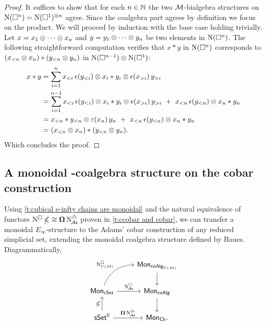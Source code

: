 \begin{proof}
	It suffices to show that for each $n \in \mathbb{N}$ the two $\mathcal{M}$-bialgebra structures on $\operatorname{N}(\square^n) = \operatorname{N}(\square^1)^{\otimes n}$ agree.
	Since the coalgebra part agrees by definition we focus on the product.
	We will proceed by induction with the base case holding trivially.
	Let $x = x_1 \otimes \dotsb \otimes x_n$ and $y = y_1 \otimes \dotsb \otimes y_n$ be two elements in $\operatorname{N}(\square^n)$.
	The following straightforward computation verifies that $x \ast y$ in $\operatorname{N}(\square^n)$ corresponds to $(x_{<n} \otimes x_n) \ast (y_{<n} \otimes y_n)$ in $\operatorname{N}(\square^{n-1}) \otimes \operatorname{N}(\square^1)$:
	\begin{align*}
		x \ast y &=
		\sum_{i=1}^n x_{<i}\, \epsilon(y_{<i}) \otimes x_i \ast y_i \otimes \epsilon(x_{>i}) \, y_{>i} \\ &=
		\sum_{i=1}^{n-1} x_{<i}\, \epsilon(y_{<i}) \otimes x_i \ast y_i \otimes \epsilon(x_{>i}) \, y_{>i} \ +\
		x_{<n}\, \epsilon(y_{<n}) \otimes x_n \ast y_n \\ &=
		x_{<n} \ast y_{<n} \otimes \operatorname{\varepsilon}(x_n)\, y_n \ +\ x_{<n}\, \epsilon(y_{<n}) \otimes x_n \ast y_n \\ &=
		(x_{<n} \otimes x_n) \ast (y_{<n} \otimes y_n).
	\end{align*}
	Which concludes the proof.
\end{proof}

\subsection{A monoidal \pdfEinfty-coalgebra structure on the cobar construction}\label{ss:e-infty on cobar}


Using \cref{t:cubical e-infty chains are monoidal} and the natural equivalence of functors $\operatorname{N^{\square}} \operatorname{\mathbb{\Omega}} \cong \operatorname{\mathbf{\Omega}} \operatorname{N^{\triangle}_{\!{\mathcal{A}\mathsf{s}}}}$ proven in \cref{t:ccobar and cobar}, we can transfer a monoidal $E_\infty$-structure to the Adams' cobar construction of any reduced simplicial set, extending the monoidal coalgebra structure defined by Baues.
Diagrammatically,
\[
\begin{tikzcd}
	& \Mon_{\coAlg_\UM} \arrow[d] \\
	\Mon_{\cSet} \arrow[ru, "\cchainsUM", out=70, in=180] \arrow[r, "\cchainsA"]
	& \Mon_{\coAlg} \arrow[d] \\
	\sSet^0 \arrow[r, "\cobar \schainsA"] \arrow[u, "\ccobar"]
	& \Mon_{\Ch}.
\end{tikzcd}
\]


